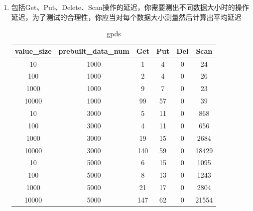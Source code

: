 \documentclass[fontset=none]{article}
\begin{document}
\begin{enumerate}
    \item 包括Get、Put、Delete、Scan操作的延迟，你需要测出不同数据大小时的操作延迟，为了测试的合理性，你应当对每个数据大小测量然后计算出平均延迟
    \begin{table}[H]
    \centering
    \begin{tabular}{|c|c|c|c|c|c|}
    \hline
    value\_size & prebuilt_data_num & Get & Put & Del & Scan \\
    \hline
    10 & 1000 & 1 & 4 & 0 & 24 \\
    100 & 1000 & 2 & 4 & 0 & 26 \\
    1000 & 1000 & 9 & 7 & 0 & 23 \\
    10000 & 1000 & 99 & 57 & 0 & 39 \\
    10 & 3000 & 5 & 11 & 0 & 868 \\
    100 & 3000 & 4 & 11 & 0 & 656 \\
    1000 & 3000 & 19 & 15 & 0 & 2684 \\
    10000 & 3000 & 140 & 59 & 0 & 18429 \\
    10 & 5000 & 6 & 15 & 0 & 1095 \\
    100 & 5000 & 8 & 13 & 0 & 1243 \\
    1000 & 5000 & 21 & 17 & 0 & 2804 \\
    10000 & 5000 & 147 & 62 & 0 & 21554 \\
    \hline
    \end{tabular}
    \caption{gpds}
    \end{table}


\end{enumerate}
\end{document}
